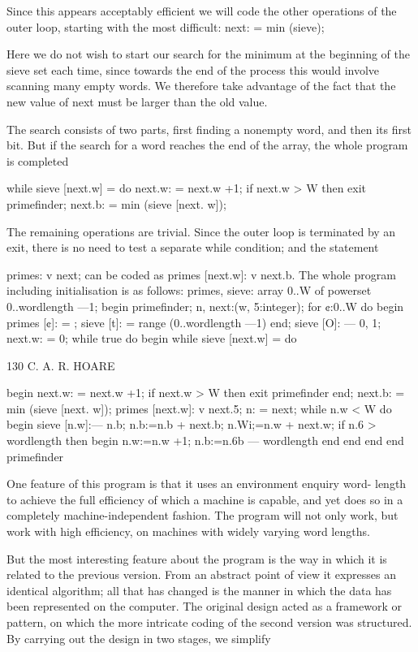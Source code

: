 {{{{				Since this appears acceptably efficient we will code the other operations of the outer loop, starting with the most difficult: next: = min (sieve);
				
				Here we do not wish to start our search for the minimum at the beginning of the sieve set each time, since towards the end of the process this would involve scanning many empty words. We therefore take advantage of the fact that the new value of next must be larger than the old value.
				
				The search consists of two parts, first finding a nonempty word, and then its first bit. But if the search for a word reaches the end of the array, the whole program is completed
				
				while sieve [next.w] = { }do {next.w: = next.w +1; if next.w > W then exit primefinder}; next.b: = min (sieve [next. w]);
				
				The remaining operations are trivial. Since the outer loop is terminated by an exit, there is no need to test a separate while condition; and the statement
				
				primes: v {next}; can be coded as primes [next.w]: v {next.b}. The whole program including initialisation is as follows: primes, sieve: array 0..W of powerset 0..wordlength —1; begin primefinder; n, next:(w, 5:integer); for ¢:0..W do begin primes [¢]: = { }; sieve [t]: = range (0..wordlength —1) end; sieve [O]: — {0, 1}; next.w: = 0; while true do begin while sieve [next.w] = { } do
				
				130 C. A. R. HOARE
				
				begin next.w: = next.w +1; if next.w > W then exit primefinder end; next.b: = min (sieve [next. w]); primes [next.w]: v {next.5}; n: = next; while n.w < W do begin sieve [n.w]:— {n.b}; n.b:=n.b + next.b; n.Wi;=n.w + next.w; if n.6 > wordlength then begin n.w:=n.w +1; n.b:=n.6b — wordlength end end end end primefinder
				
				One feature of this program is that it uses an environment enquiry word- length to achieve the full efficiency of which a machine is capable, and yet does so in a completely machine-independent fashion. The program will not only work, but work with high efficiency, on machines with widely varying word lengths.
				
				But the most interesting feature about the program is the way in which it is related to the previous version. From an abstract point of view it expresses an identical algorithm; all that has changed is the manner in which the data has been represented on the computer. The original design acted as a framework or pattern, on which the more intricate coding of the second version was structured. By carrying out the design in two stages, we simplify
				
}}}}
